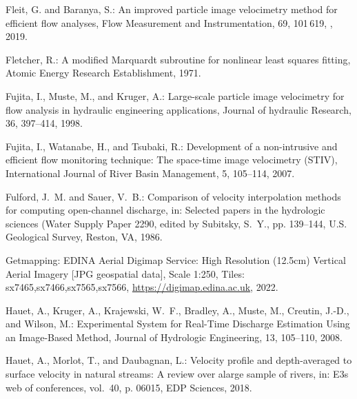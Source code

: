 \documentclass[hess, manuscript]{copernicus} %
\begin{document}
\begin{thebibliography}{68}
Fleit, G. and Baranya, S.: An improved particle image velocimetry method for
  efficient flow analyses, Flow Measurement and Instrumentation, 69, 101\,619,
  , 2019.

Fletcher, R.: A modified Marquardt subroutine for nonlinear least squares
  fitting, Atomic Energy Research Establishment, 1971.

Fujita, I., Muste, M., and Kruger, A.: Large-scale particle image velocimetry
  for flow analysis in hydraulic engineering applications, Journal of hydraulic
  Research, 36, 397--414, 1998.

Fujita, I., Watanabe, H., and Tsubaki, R.: Development of a non-intrusive and
  efficient flow monitoring technique: The space-time image velocimetry (STIV),
  International Journal of River Basin Management, 5, 105--114, 2007.

Fulford, J.~M. and Sauer, V.~B.: Comparison of velocity interpolation methods
  for computing open-channel discharge, in: Selected papers in the hydrologic
  sciences (Water Supply Paper 2290, edited by Subitsky, S.~Y., pp. 139--144,
  U.S. Geological Survey, Reston, VA, 1986.

{Getmapping: EDINA Aerial Digimap Service}: High Resolution (12.5cm) Vertical
  Aerial Imagery [JPG geospatial data], Scale 1:250, Tiles:
  sx7465,sx7466,sx7565,sx7566, \urlprefix\url{https://digimap.edina.ac.uk},
  2022.

Hauet, A., Kruger, A., Krajewski, W.~F., Bradley, A., Muste, M., Creutin,
  J.-D., and Wilson, M.: Experimental System for Real-Time Discharge Estimation
  Using an Image-Based Method, Journal of Hydrologic Engineering, 13, 105--110,
  2008.

Hauet, A., Morlot, T., and Daubagnan, L.: Velocity profile and depth-averaged
  to surface velocity in natural streams: A review over alarge sample of
  rivers, in: E3s web of conferences, vol.~40, p. 06015, EDP Sciences, 2018.


\end{thebibliography}
\end{document}
